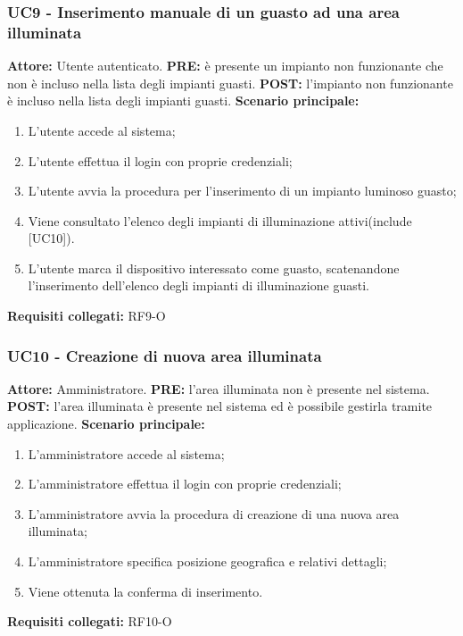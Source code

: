 \documentclass[a4paper, 12pt]{article}
\begin{document}
\subsubsection{UC9 - Inserimento manuale di un guasto ad una area illuminata}
\textbf{Attore:} Utente autenticato.\newline
\textbf{PRE:} è presente un impianto non funzionante che non è incluso nella lista degli impianti guasti.\newline
\textbf{POST:} l'impianto non funzionante è incluso nella lista degli impianti guasti.\newline
\textbf{Scenario principale:}
\begin{enumerate}
    \item L'utente accede al sistema;
    \item L'utente effettua il login con proprie credenziali;
    \item L'utente avvia la procedura per l’inserimento di un impianto luminoso guasto;
    \item Viene consultato l’elenco degli impianti di illuminazione attivi(include [UC10]).
    \item L'utente marca il dispositivo interessato come guasto, scatenandone l’inserimento dell’elenco degli impianti di illuminazione guasti.
\end{enumerate}
\textbf{Requisiti collegati:} RF9-O\newline

\subsubsection{UC10 - Creazione di nuova area illuminata}
\textbf{Attore:} Amministratore.\newline
\textbf{PRE:} l'area illuminata non è presente nel sistema.\newline
\textbf{POST:} l'area illuminata è presente nel sistema ed è possibile gestirla tramite applicazione.\newline
\textbf{Scenario principale:}
\begin{enumerate}
    \item L'amministratore accede al sistema;
    \item L'amministratore effettua il login con proprie credenziali;
    \item L'amministratore avvia la procedura di creazione di una nuova area illuminata;
    \item L'amministratore specifica posizione geografica e relativi dettagli;
    \item Viene ottenuta la conferma di inserimento.
\end{enumerate}
\textbf{Requisiti collegati:} RF10-O\newline
\end{document}
